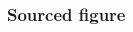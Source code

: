 \begin{frame}
    \frametitle{Sourced figure}


    \begin{columns}
        \begin{column}{0.7\textwidth}

            \lipsum[1]

        \end{column}
        \begin{column}{0.3\textwidth}


        \end{column}
    \end{columns}


\end{frame}



